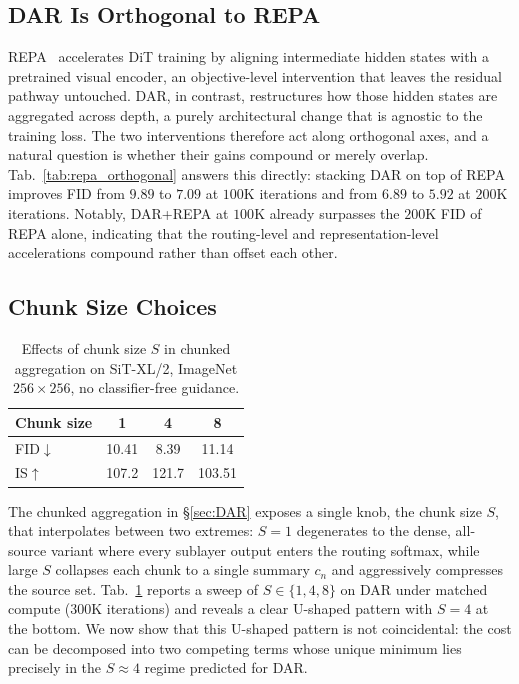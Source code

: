 \documentclass[]{ant_tech_report}
\begin{document}
\subsection{DAR Is Orthogonal to REPA}
REPA~\citep{yu2025repa} accelerates DiT training by aligning intermediate hidden states with a pretrained visual encoder, an objective-level intervention that leaves the residual pathway untouched. \textsc{DAR}, in contrast, restructures how those hidden states are aggregated across depth, a purely architectural change that is agnostic to the training loss. The two interventions therefore act along orthogonal axes, and a natural question is whether their gains compound or merely overlap. Tab.~\ref{tab:repa_orthogonal} answers this directly: stacking \textsc{DAR} on top of REPA improves FID from $9.89$ to $7.09$ at $100\text{K}$ iterations and from $6.89$ to $5.92$ at $200\text{K}$ iterations. Notably, \textsc{DAR}+REPA at $100\text{K}$ already surpasses the $200\text{K}$ FID of REPA alone, indicating that the routing-level and representation-level accelerations compound rather than offset each other.

\subsection{Chunk Size Choices}
\label{sec:chunk}

\begin{table}
\vspace{-1.0em}
\centering
\setlength{\tabcolsep}{6pt}
\renewcommand{\arraystretch}{1.12}
\small
\begin{tabular}{lccc}
\toprule
Chunk size & 1 & 4 & 8 \\
\midrule
FID$\downarrow$ & 10.41 & 8.39  & 11.14 \\
IS$\uparrow$    & 107.2 & 121.7 & 103.51 \\
\bottomrule
\end{tabular}
\caption{Effects of chunk size $S$ in chunked aggregation on SiT-XL/2, ImageNet $256{\times}256$, no classifier-free guidance.}
\label{tab:chunk_size}
\vspace{-0.8em}
\end{table}

The chunked aggregation in \S\ref{sec:DAR} exposes a single knob, the chunk size $S$, that interpolates between two extremes: $S=1$ degenerates to the dense, all-source variant where every sublayer output enters the routing softmax, while large $S$ collapses each chunk to a single summary $c_n$ and aggressively compresses the source set. Tab.~\ref{tab:chunk_size} reports a sweep of $S \in \{1, 4, 8\}$ on \textsc{DAR} under matched compute ($300\text{K}$ iterations) and reveals a clear U-shaped pattern with $S = 4$ at the bottom. We now show that this U-shaped pattern is not coincidental: the cost can be decomposed into two competing terms whose unique minimum lies precisely in the $S \approx 4$ regime predicted for \textsc{DAR}.
\end{document}
